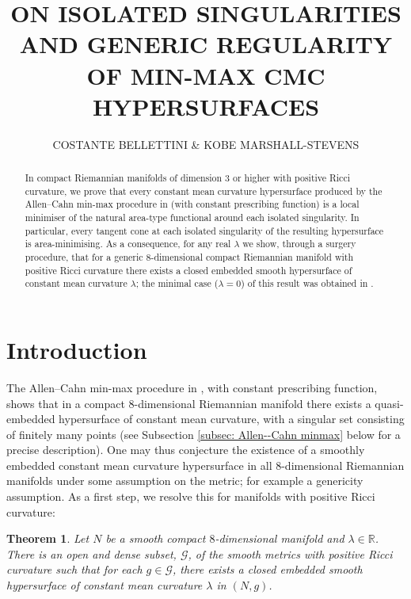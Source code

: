 \documentclass[11pt]{article}
\newtheorem{thm}{Theorem}
\begin{document}
\title{\textbf{ON ISOLATED SINGULARITIES AND GENERIC REGULARITY OF MIN-MAX CMC HYPERSURFACES}}
\author{COSTANTE BELLETTINI \& KOBE MARSHALL-STEVENS}
\date{\vspace{-5ex}}
\maketitle

\begin{abstract}
\noindent In compact Riemannian manifolds of dimension 3 or higher with positive Ricci curvature, we prove that every constant mean curvature hypersurface produced by the Allen--Cahn min-max procedure in \cite{bellettini-wickramasekera} (with constant prescribing function) is a local minimiser of the natural area-type functional around each isolated singularity. In particular, every tangent cone at each isolated singularity of the resulting hypersurface is area-minimising. As a consequence, for any real $\lambda$ we show, through a surgery procedure, that for a generic 8-dimensional compact Riemannian manifold with positive
Ricci curvature there exists a closed embedded smooth hypersurface of constant mean curvature $\lambda$; the minimal case ($\lambda = 0$) of this result was obtained in \cite{C-L-S}. 
\end{abstract}

\tableofcontents

\section{Introduction}\label{sec: introduction}

The Allen--Cahn min-max procedure in \cite{bellettini-wickramasekera}, with constant prescribing function, shows that in a compact $8$-dimensional Riemannian manifold there exists a quasi-embedded hypersurface of constant mean curvature, with a singular set consisting of finitely many points (see Subsection \ref{subsec: Allen--Cahn minmax} below for a precise description). One may thus conjecture the existence of a smoothly embedded constant mean curvature hypersurface in all $8$-dimensional Riemannian manifolds under some assumption on the metric; for example a genericity assumption. As a first step, we resolve this for manifolds with positive Ricci curvature:

\begin{thm}\label{thm: generic regularity in dimension 8 in positive ricci} Let $N$ be a smooth compact $8$-dimensional manifold and $\lambda \in \mathbb{R}$. There is an open and dense subset, $\mathcal{G}$, of the smooth metrics with positive Ricci curvature such that for each $g \in \mathcal{G}$, there exists a closed embedded smooth hypersurface of constant mean curvature $\lambda$ in $(N,g)$.
\end{thm}
\end{document}
